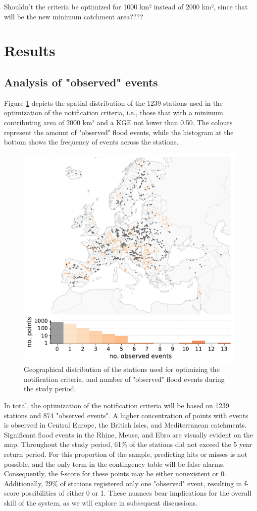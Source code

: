 \documentclass[preprint,12pt,authoryear]{elsarticle}
\begin{document}
Shouldn't the criteria be optimized for 1000 km² instead of 2000 km², since that will be the new minimum catchment area????

\section{Results}
\label{sec:results}

\subsection{Analysis of "observed" events}
\label{sec:obs_events}

Figure \ref{fig:map_observed} depicts the spatial distribution of the 1239 stations used in the optimization of the notification criteria, i.e., those that with a minimum contributing area of 2000 km² and a KGE not lower than 0.50. The colours represent the amount of "observed" flood events, while the histogram at the bottom shows the frequency of events across the stations.

\begin{figure}
    \centering
    \includegraphics[width=0.75\linewidth]{figures/map_observed_events_2000km2_1239points.pdf}
    \caption{Geographical distribution of the stations used for optimizing the notification criteria, and number of "observed" flood events during the study period.}
    \label{fig:map_observed}
\end{figure}

In total, the optimization of the notification criteria will be based on 1239 stations and 874 "observed events". A higher concentration of points with events is observed in Central Europe, the British Isles, and Mediterranean catchments. Significant flood events in the Rhine, Meuse, and Ebro are visually evident on the map. Throughout the study period, 61\% of the stations did not exceed the 5 year return period. For this proportion of the sample, predicting hits or misses is not possible, and the only term in the contingency table will be false alarms. Consequently, the f-score for these points may be either nonexistent or 0. Additionally, 29\% of stations registered only one "observed" event, resulting in f-score possibilities of either 0 or 1. These nuances bear implications for the overall skill of the system, as we will explore in subsequent discussions. 
\end{document}
